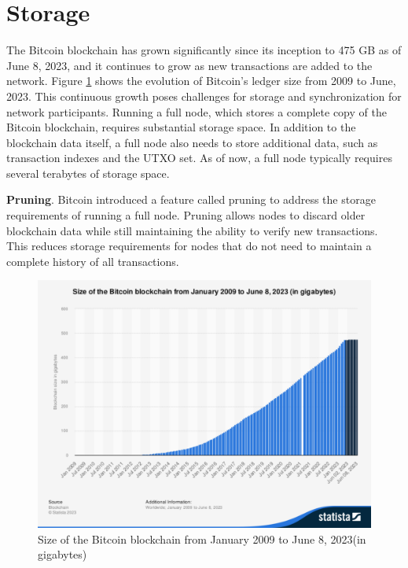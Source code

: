 \section{Storage}

The Bitcoin blockchain has grown significantly since its inception to 475 GB as of June 8, 2023, and it continues to grow as new transactions are added to the network. Figure \ref{F_storage_btc} shows the evolution of Bitcoin's ledger size from 2009 to June, 2023. This continuous growth poses challenges for storage and synchronization for network participants. Running a full node, which stores a complete copy of the Bitcoin blockchain, requires substantial storage space. In addition to the blockchain data itself, a full node also needs to store additional data, such as transaction indexes and the UTXO set. As of now, a full node typically requires several terabytes of storage space.

\textbf{Pruning}. Bitcoin introduced a feature called pruning to address the storage requirements of running a full node. Pruning allows nodes to discard older blockchain data while still maintaining the ability to verify new transactions. This reduces storage requirements for nodes that do not need to maintain a complete history of all transactions.


\begin{figure}[ht]
    \centering
     \includegraphics[scale=0.33]{Images/storage_btc.pdf}
    \caption{Size of the Bitcoin blockchain from January 2009 to June 8, 2023(in gigabytes) \cite{StatistaBTC2023}}
    \label{F_storage_btc}
    \end{figure}